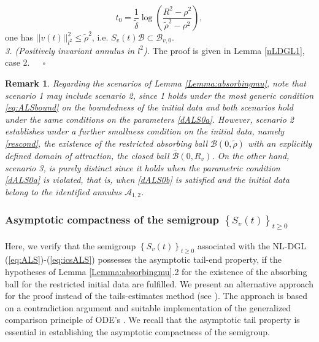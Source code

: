 \documentclass[preprintnumbers,amsmath,amssymb]{revtex4}
\newtheorem{remark}{Remark}[section]
\begin{document}
\begin{equation}
 t_0=\frac{1}{\tilde{\delta}}\log\left(\frac{R^2-\rho^2}{\tilde{\rho}^2-\rho^2}\right),
\end{equation}
 one has $|| v(t)||_{l^2}^2\le \tilde{\rho}^2$, i.e. 
$S_v(t)\mathcal{B}\subset \mathcal{B}_{v,0}$. \\
\textit{3. (Positively invariant annulus in $l^2$).} The proof is given in Lemma 	\ref{nLDGL1}, case 2.\ \ \ $\square$
\begin{remark}
	\label{remcon}
Regarding the scenarios of Lemma \ref{Lemma:absorbingmu}, note that scenario 1 may include scenario 2, since 1 holds under the most generic condition \eqref{eq:ALSbound} on the boundedness of the initial data and both scenarios hold under the same conditions on the parameters \eqref{dALS0a}. However, scenario 2 establishes under a further smallness condition on the initial data, namely \eqref{rescond}, the existence of the restricted absorbing ball $\mathcal{B}(0,\tilde{\rho})$ with an explicitly defined domain of attraction, the closed ball $\overline{\mathcal{B}}(0,R_v)$. On the other hand, scenario 3, is purely distinct since it holds when the parametric condition \eqref{dALS0a} is violated, that is, when \eqref{dALS0b} is satisfied and the initial data belong to the identified annulus $\mathcal{A}_{1,2}$.
\end{remark}
%
\subsubsection{Asymptotic compactness of the semigroup $\left\{S_v(t)\right\}_{t\ge 0}$}

Here, we verify that the semigroup $\left\{S_v(t)\right\}_{t\ge 0}$ associated with the NL-DGL (\ref{eq:ALS})-(\ref{eq:icsALS}) possesses the asymptotic tail-end property, if the hypotheses of Lemma \ref{Lemma:absorbingmu}.2 for the existence of the absorbing ball for the restricted initial data are fulfilled. We present an alternative approach for the proof instead of the tails-estimates method (see \cite{Bates, Zhou0,Zhou,Zhou1,Zhou3,Wang,Zhou2,Nikos,NAE2007,Du}). The approach is based on a contradiction argument and suitable implementation of the generalized comparison principle of ODE's \cite{McNabb1986}. We recall that the asymptotic tail property is essential in establishing the asymptotic compactness of the semigroup.
\end{document}
